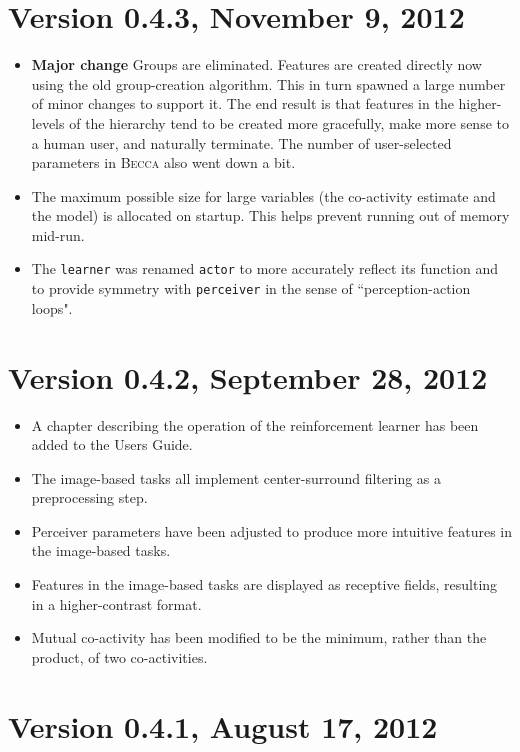 \section*{Version 0.4.3, November 9, 2012}

\begin{itemize}
\item {\bf Major change} Groups are eliminated. Features are created directly now using the old group-creation algorithm. This in turn spawned a large number of minor changes to support it. The end result is that features in the higher-levels of the hierarchy tend to be created more gracefully, make more sense to a human user, and naturally terminate. The number of user-selected parameters in \textsc{Becca} also went down a bit.
\item The maximum possible size for large variables (the co-activity estimate and the model) is allocated on startup. This helps prevent running out of memory mid-run.
\item The \texttt{learner} was renamed \texttt{actor} to more accurately reflect its function and to provide symmetry with \texttt{perceiver} in the sense of ``perception-action loops". 
\end{itemize}

\section*{Version 0.4.2, September 28, 2012}

\begin{itemize}
\item A chapter describing the operation of the reinforcement learner has been added to the Users Guide.
\item The image-based tasks all implement center-surround filtering as a preprocessing step.
\item Perceiver parameters have been adjusted to produce more intuitive features in the image-based tasks.
\item Features in the image-based tasks are displayed as receptive fields, resulting in a higher-contrast format.
\item Mutual co-activity has been modified to be the minimum, rather than the product, of two co-activities.
\end{itemize}


\section*{Version 0.4.1, August 17, 2012}

